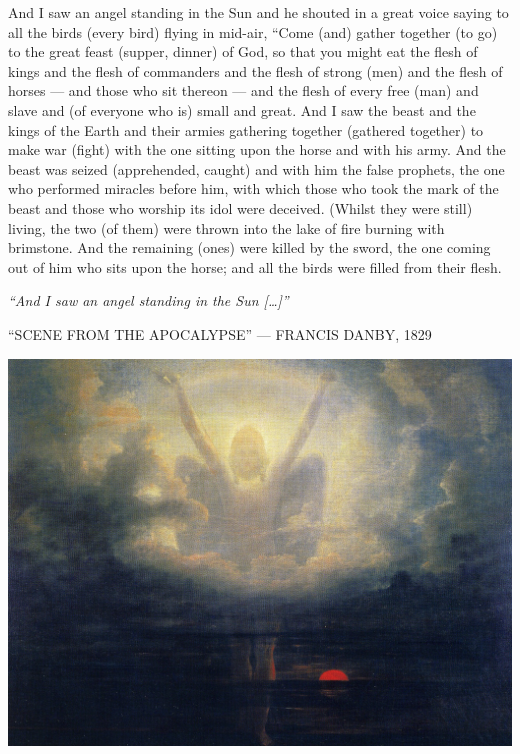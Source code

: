 \begin{pages}
\begin{Leftside}
		\pend
		\pstart
		And I saw an angel standing in the Sun and he shouted in a great voice saying to all the birds (every bird) flying in mid-air, “Come (and) gather together (to go) to the great feast (supper, dinner) of God, so that you might eat the flesh of kings and the flesh of commanders and the flesh of strong (men) and the flesh of horses — and those who sit thereon — and the flesh of every free (man) and slave and (of everyone who is) small and great. 
		\pend
		\pstart
		And I saw the beast and the kings of the Earth and their armies gathering together (gathered together) to make war (fight) with the one sitting upon the horse and with his army. And the beast was seized (apprehended, caught) and with him the false prophets, the one who performed miracles before him, with which those who took the mark of the beast and those who worship its idol were deceived. (Whilst they were still) living, the two (of them) were thrown into the lake of fire burning with brimstone. And the remaining (ones) were killed by the sword, the one coming out of him who sits upon the horse; and all the birds were filled from their flesh. 
		\pend
        \endnumbering
    \end{Leftside}

\end{pages} 
\Pages

\clearpage
\thispagestyle{empty}
\null\vfill
\settowidth{}
\begin{center}
\parbox{\longest}{%
  \raggedright{\huge\itshape%
    ``And I saw an angel standing in the Sun […]'' \par\bigskip
  }
  \raggedleft\Large\MakeUppercase{``Scene from the Apocalypse'' — Francis Danby, 1829}\par%
}
\vfill\vfill
\clearpage\newpage
\end{center}
\newpage
\thispagestyle{empty}
\begin{center}
	\includegraphics[angle=90, width=1\textwidth]{images/illustrations/danbyapocalypse}
\end{center}